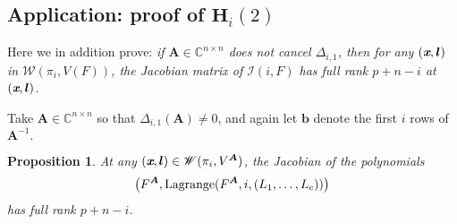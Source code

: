 \documentclass[a4paper]{article}
\def\A{\mathfrak{A}}
\def\mA{{\bm A}}
\def\lb{{\bm l}}
\def\xb{\textit{\textbf{x}}}
\def\D{\Delta}
\DeclareMathOperator{\lag}{Lagrange}
\def\C{\mathbb{C}}
\def\lagFA{{\bm\lag}(F^{\mA},i,(L_1,\hdots,L_c))}
\def\WilAnu{\mathscr{W}(\pi_i,V^{\mA})}
\newtheorem{prop}[theorem]{Proposition}
\begin{document}
%






\subsection{Application: proof of $\textbf{H}_i(2)$}\label{Hi2}
Here we in addition prove: \textit{if $\mA
    \in \C^{n\times n}$ does not cancel $\D_{i,1}$, then for any $(\xb,\lb)$ in $\mathscr{W}(\pi_i,V(F))$, the Jacobian matrix of $\mathscr{I}(i,F)$ has full rank $p+n-i$ at $(\xb,\lb)$.}    
    \par 
    Take $\mA \in \C^{n \times n}$ so that $\Delta_{i,1}(\mA) \not = 0$, and again let $\bm b$ denote the first $i$ rows of $\mA^{-1}.$
    \begin{prop}\label{prop:LagIdeal}
    At any $(\xb,\lb) \in \WilAnu$, the Jacobian of the polynomials 
    \[
    \left(F^{\mA},\lagFA\right)
    \]
    has full rank $p+n-i$. 
    \end{prop}
\end{document}
